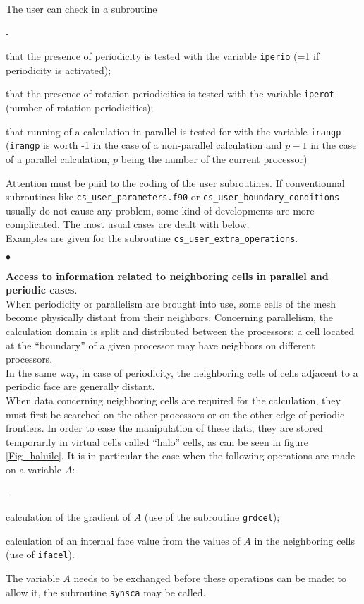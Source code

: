 {{{The user can check in a subroutine
\begin{list}{-}{}
\item that the presence of periodicity is tested with the variable
      \texttt{iperio} (=1 if periodicity is activated);
\item that the presence of rotation periodicities is tested with the variable
      \texttt{iperot} (number of rotation periodicities);
\item that running of a calculation in parallel is tested for with the
      variable \texttt{irangp} (\texttt{irangp} is worth -1 in the case of a
      non-parallel calculation and $p-1$ in the case of a parallel calculation,
      $p$ being the number of the current processor)
\end{list}
Attention must be paid to the coding of the user subroutines. If
conventionnal subroutines like \texttt{cs\_user\_parameters.f90} or \texttt{cs\_user\_boundary\_conditions}
usually do not cause any problem, some kind of developments are more
complicated. The most usual cases are dealt with below. \\ Examples are
given for the subroutine \texttt{cs\_user\_extra\_operations}.
\begin{list}{$\bullet$}{}
\item {\bf Access to information related to neighboring cells in
      parallel and periodic cases}.\\
When periodicity or parallelism are brought into use, some cells of the
      mesh become physically distant from their neighbors. Concerning
      parallelism, the calculation domain is split and distributed
      between the processors: a cell located at the ``boundary'' of a
      given processor may have neighbors on different processors. \\
In the same way, in case of periodicity, the neighboring cells of cells
      adjacent to a periodic face are generally distant. \\
When data concerning neighboring cells are required for the
      calculation, they must first be searched on the other processors
      or on the other edge of periodic frontiers. In order to ease the
      manipulation of these data, they are stored temporarily in virtual
      cells called ``halo'' cells, as can be seen in figure \ref{Fig_haluile}.
It is in particular the case when the following operations are made on a
      variable $A$:
\begin{list}{-}{}
\item calculation of the gradient of $A$ (use of the subroutine \texttt{grdcel});
\item calculation of an internal face value from the values of $A$  in
      the neighboring cells (use of \texttt{ifacel}).
\end{list}
The variable $A$ needs to be exchanged before these operations can be
      made: to allow it, the subroutine \texttt{synsca} may be called.


\end{list}}}}

